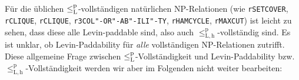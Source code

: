 Für die üblichen $\leq_\mathrm{L}^\mathrm{p}$-vollständigen natürlichen NP-Relationen (wie \texttt{rSETCOVER}, \texttt{rCLIQUE}, \texttt{rCLIQUE}, \texttt{r3COL"-OR"-AB"-ILI"-TY}, \texttt{rHAMCYCLE}, \texttt{rMAXCUT}) ist leicht zu sehen, dass diese alle Levin-paddable sind, also auch $\leq_\mathrm{L,h}^\mathrm p$-vollständig sind.
Es ist unklar, ob Levin-Paddability für \emph{alle} vollständigen NP-Relationen zutrifft. Diese allgemeine Frage zwischen $\leq_\mathrm{L}^\mathrm{p}$-Vollständigkeit und Levin-Paddability bzw. $\leq_\mathrm{L,h}^\mathrm p$-Vollständigkeit werden wir aber im Folgenden nicht weiter bearbeiten:
%
